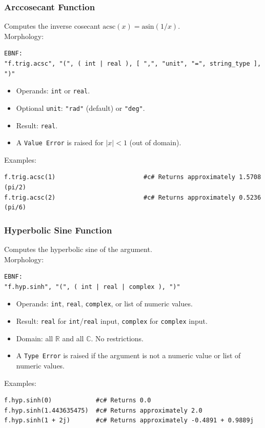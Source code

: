 \subsubsection{Arccosecant Function}
Computes the inverse cosecant $\text{acsc}(x) = \text{asin}(1/x)$. \\
Morphology:
\begin{verbatim}
EBNF:
"f.trig.acsc", "(", ( int | real ), [ ",", "unit", "=", string_type ], ")"
\end{verbatim}
\begin{itemize}
\item Operands: \texttt{int} or \texttt{real}.
\item Optional \texttt{unit}: \texttt{"rad"} (default) or \texttt{"deg"}.
\item Result: \texttt{real}.
\item A \texttt{Value Error} is raised for $|x| < 1$ (out of domain).
\end{itemize}
Examples:
\begin{verbatim}
f.trig.acsc(1)                        #c# Returns approximately 1.5708 (pi/2)
f.trig.acsc(2)                        #c# Returns approximately 0.5236 (pi/6)
\end{verbatim}

\subsubsection{Hyperbolic Sine Function}
Computes the hyperbolic sine of the argument. \\
Morphology:
\begin{verbatim}
EBNF:
"f.hyp.sinh", "(", ( int | real | complex ), ")"
\end{verbatim}
\begin{itemize}
\item Operands: \texttt{int}, \texttt{real}, \texttt{complex}, or list of numeric values.
\item Result: \texttt{real} for \texttt{int}/\texttt{real} input, \texttt{complex} for \texttt{complex} input.
\item Domain: all $\mathbb{R}$ and all $\mathbb{C}$. No restrictions.
\item A \texttt{Type Error} is raised if the argument is not a numeric value or list of numeric values.
\end{itemize}
Examples:
\begin{verbatim}
f.hyp.sinh(0)            #c# Returns 0.0
f.hyp.sinh(1.443635475)  #c# Returns approximately 2.0
f.hyp.sinh(1 + 2j)       #c# Returns approximately -0.4891 + 0.9889j
\end{verbatim}

